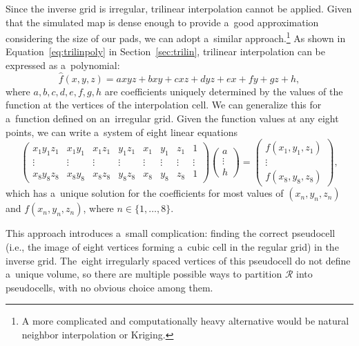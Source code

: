 			Since the inverse grid is irregular, trilinear interpolation cannot be applied. Given that the simulated map is dense enough to provide a~good approximation considering the size of our pads, we can adopt a~similar approach.\footnote{A more complicated and computationally heavy alternative would be natural neighbor interpolation or Kriging.} As shown in Equation~\ref{eq:trilinpoly} in Section~\ref{sec:trilin}, trilinear interpolation can be expressed as a~polynomial:
				\begin{equation}
					\widehat{f}(x,y,z) = axyz + bxy + cxz + dyz + ex + fy + gz + h,
				\end{equation}
			where $a,b,c,d,e,f,g,h$ are coefficients uniquely determined by the values of the function at the vertices of the interpolation cell. We can generalize this for a~function defined on an~irregular grid. Given the function values at any eight points, we can write a~system of eight linear equations
				\begin{equation}
					\begin{pmatrix}
						x_1 y_1 z_1 & x_1 y_1 & x_1 z_1 & y_1 z_1 & x_1 & y_1 & z_1 & 1\\
						\vdots & \vdots & \vdots & \vdots & \vdots & \vdots & \vdots & \vdots\\
						x_8 y_8 z_8 & x_8 y_8 & x_8 z_8 & y_8 z_8 & x_8 & y_8 & z_8 & 1
					\end{pmatrix}
					\begin{pmatrix}
						a\\
						\vdots\\
						h
					\end{pmatrix}
					=
					\begin{pmatrix}
						f(x_1,y_1,z_1)\\
						\vdots\\
						f(x_8,y_8,z_8)
					\end{pmatrix},
				\end{equation}
			which has a~unique solution for the coefficients for most values of $(x_n, y_n, z_n)$ and $f(x_n,y_n,z_n)$, where $n\in\{1,\ldots,8\}$.
			
			This approach introduces a~small complication: finding the correct pseudocell (i.e., the image of eight vertices forming a~cubic cell in the regular grid) in the inverse grid. The~eight irregularly spaced vertices of this pseudocell do not define a~unique volume, so there are multiple possible ways to partition $\mathcal{R}$ into pseudocells, with no obvious choice among them.
			
